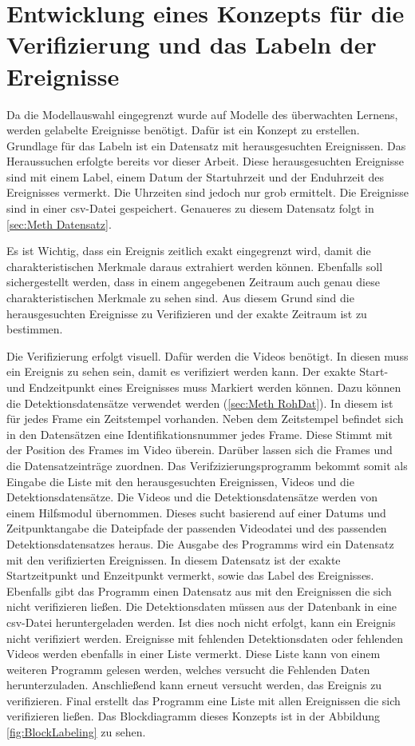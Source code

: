 \section{Entwicklung eines Konzepts für die Verifizierung und das Labeln der Ereignisse} \label{sec:Meth Labeling}
Da die Modellauswahl eingegrenzt wurde auf Modelle des überwachten Lernens, werden gelabelte Ereignisse benötigt. Dafür ist ein Konzept zu erstellen. Grundlage für das Labeln ist ein Datensatz mit herausgesuchten Ereignissen. Das Heraussuchen erfolgte bereits vor dieser Arbeit. Diese herausgesuchten Ereignisse sind mit einem Label, einem Datum der Startuhrzeit und der Enduhrzeit des Ereignisses vermerkt. Die Uhrzeiten sind jedoch nur grob ermittelt. Die Ereignisse sind in einer csv-Datei gespeichert. Genaueres zu diesem Datensatz folgt in  \autoref{sec:Meth Datensatz}. \par

Es ist Wichtig, dass ein Ereignis zeitlich exakt eingegrenzt wird, damit die charakteristischen Merkmale daraus extrahiert werden können. Ebenfalls soll sichergestellt werden, dass in einem angegebenen Zeitraum auch genau diese charakteristischen Merkmale zu sehen sind. Aus diesem Grund sind die herausgesuchten Ereignisse zu Verifizieren und der exakte Zeitraum ist zu bestimmen. \par 

Die Verifizierung erfolgt visuell. Dafür werden die Videos benötigt. In diesen muss ein Ereignis zu sehen sein, damit es verifiziert werden kann. Der exakte Start- und Endzeitpunkt eines Ereignisses muss Markiert werden können. Dazu können die Detektionsdatensätze verwendet werden (\autoref{sec:Meth RohDat}). In diesem ist für jedes Frame ein Zeitstempel vorhanden. Neben dem Zeitstempel befindet sich in den Datensätzen eine Identifikationsnummer jedes Frame. Diese Stimmt mit der Position des Frames im Video überein. Darüber lassen sich die Frames und die Datensatzeinträge zuordnen. Das Verifzizierungsprogramm bekommt somit als Eingabe die Liste mit den herausgesuchten Ereignissen, Videos und die Detektionsdatensätze. Die Videos und die Detektionsdatensätze werden von einem Hilfsmodul übernommen. Dieses sucht basierend auf einer Datums und Zeitpunktangabe die Dateipfade der passenden Videodatei und des passenden Detektionsdatensatzes heraus. Die Ausgabe des Programms wird ein Datensatz mit den verifizierten Ereignissen. In diesem Datensatz ist der exakte Startzeitpunkt und Enzeitpunkt vermerkt, sowie das Label des Ereignisses. Ebenfalls gibt das Programm einen Datensatz aus mit den Ereignissen die sich nicht verifizieren ließen. Die Detektionsdaten müssen aus der Datenbank in eine csv-Datei heruntergeladen werden. Ist dies noch nicht erfolgt, kann ein Ereignis nicht verifiziert werden. Ereignisse mit fehlenden Detektionsdaten oder fehlenden Videos werden ebenfalls in einer Liste vermerkt. Diese Liste kann von einem weiteren Programm gelesen werden, welches versucht die Fehlenden Daten herunterzuladen. Anschließend kann erneut versucht werden, das Ereignis zu verifizieren. Final erstellt das Programm eine Liste mit allen Ereignissen die sich verifizieren ließen. Das Blockdiagramm dieses Konzepts ist in der Abbildung \ref{fig:BlockLabeling} zu sehen. 

